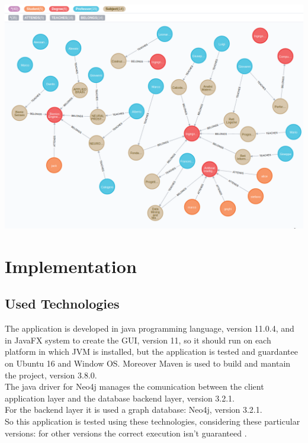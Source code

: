 \documentclass[a4paper]{article}
\begin{document}
\begin{minipage}{\linewidth}
\begin{center}
\vspace{4mm}
\includegraphics[width = 1\textwidth]{./images/diagrams/graphDb.png} 
\vspace{2mm}
\label{fig:analisys_diagram}
\end{center}
\end{minipage}
\clearpage
\section{Implementation}

\subsection{Used Technologies}
The application is developed in java programming language, version 11.0.4, and in JavaFX system to create the GUI, version 11, so it should run on each platform in which JVM is installed, but the application is tested and guardantee on Ubuntu 16 and Window OS. Moreover Maven is used  to build and mantain the project, version 3.8.0. \\
The java driver for Neo4j manages the comunication between the client application layer and the database backend layer, version 3.2.1.\\ 
For the backend layer it is used a graph database: Neo4j, version 3.2.1.\\
So this application is tested using these technologies, considering these particular versions: for other versions the correct execution isn't guaranteed .\\
\end{document}
